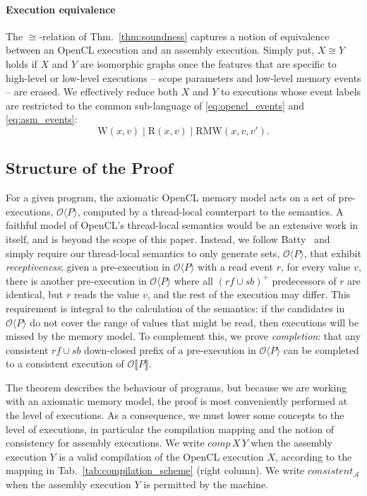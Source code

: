 \documentclass[svgnames,10pt]{sigplanconf}
\theoremstyle{definition}
\newcommand\var[1]{\mathit{#1}}
\newcommand\sem[1]{\llbracket #1 \rrbracket}
\newcommand\Hsem[1]{\mathcal{O}\sem{#1}}
\newcommand\Hcand[1]{\mathcal{O}\langle #1 \rangle}
\newcommand\Sb{\var{sb}}
\newcommand\rf{\var{rf}}
\begin{document}
\paragraph{Execution equivalence}
The $\cong$-relation of Thm.~\ref{thm:soundness} captures a notion of
equivalence between an OpenCL execution and an assembly execution.
Simply put, $X\cong Y$ holds if $X$ and $Y$ are isomorphic graphs once
the features that are specific to high-level or low-level executions -- scope parameters and low-level memory events --
are erased. We effectively reduce both $X$ and $Y$ to executions
whose event labels are restricted to the common sub-language of
\eqref{eq:opencl_events} and \eqref{eq:asm_events}:
\[
\mathrm{W}(x,v) \mid \mathrm{R}(x,v) \mid \mathrm{RMW}(x,v,v').
\]

\subsection{Structure of the Proof}

For a given program, the axiomatic OpenCL memory model acts on a set
of pre-executions, $\Hcand{P}$, computed by a thread-local counterpart
to the semantics. A faithful model of OpenCL's thread-local semantics
would be an extensive work in itself, and is beyond the scope of this
paper. Instead, we follow Batty~\cite{battythesis} and simply require
our thread-local semantics to only generate sets, $\Hcand{P}$, that
exhibit \emph{receptiveness}; given a pre-execution in $\Hcand{P}$
with a read event $r$, for every value $v$, there is another
pre-execution in $\Hcand{P}$ where all $(\rf \cup \Sb)^+$ predecessors
of $r$ are identical, but $r$ reads the value $v$, and the rest of the
execution may differ. This requirement is integral to the calculation
of the semantics: if the candidates in $\Hcand{P}$ do not cover the
range of values that might be read, then executions will be missed by
the memory model. To complement this, we prove \emph{completion}: that
any consistent $\rf \cup \Sb$ down-closed prefix of a pre-execution in
$\Hcand{P}$ can be completed to a consistent execution of $\Hsem{P}$.

The theorem describes the behaviour of programs, but because we are
working with an axiomatic memory model, the proof is most
conveniently performed at the level of executions. As a consequence,
we must lower some concepts to the level of executions, in particular
the compilation mapping and the notion of consistency for assembly
executions.  We write $\var{comp}\,X\,Y$ when the assembly execution
$Y$ is a valid compilation of the OpenCL execution $X$, according to
the mapping in Tab.~\ref{tab:compilation_scheme} (right column).  We
write $\var{consistent_\mathcal{A}}$ when the assembly execution $Y$
is permitted by the machine.
\end{document}
